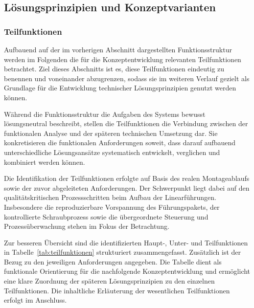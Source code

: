 \subsection{Lösungsprinzipien und Konzeptvarianten}
\subsubsection{Teilfunktionen}
\label{sec:teilfunktionen}
Aufbauend auf der im vorherigen Abschnitt dargestellten Funktionsstruktur werden im Folgenden die für die Konzeptentwicklung relevanten Teilfunktionen betrachtet. Ziel dieses Abschnitts ist es, diese Teilfunktionen eindeutig zu benennen und voneinander abzugrenzen, sodass sie im weiteren Verlauf gezielt als Grundlage für die Entwicklung technischer Lösungsprinzipien genutzt werden können.

Während die Funktionsstruktur die Aufgaben des Systems bewusst lösungsneutral beschreibt, stellen die Teilfunktionen die Verbindung zwischen der funktionalen Analyse und der späteren technischen Umsetzung dar. Sie konkretisieren die funktionalen Anforderungen soweit, dass darauf aufbauend unterschiedliche Lösungsansätze systematisch entwickelt, verglichen und kombiniert werden können.\cite{VDI2221, MKon_VL}

Die Identifikation der Teilfunktionen erfolgte auf Basis des realen Montageablaufs sowie der zuvor abgeleiteten Anforderungen. Der Schwerpunkt liegt dabei auf den qualitätskritischen Prozessschritten beim Aufbau der Linearführungen. Insbesondere die reproduzierbare Vorspannung des Führungspakets, der kontrollierte Schraubprozess sowie die übergeordnete Steuerung und Prozessüberwachung stehen im Fokus der Betrachtung.

Zur besseren Übersicht sind die identifizierten Haupt-, Unter- und Teilfunktionen in Tabelle~\ref{tab:teilfunktionen} strukturiert zusammengefasst. Zusätzlich ist der Bezug zu den jeweiligen Anforderungen angegeben. Die Tabelle dient als funktionale Orientierung für die nachfolgende Konzeptentwicklung und ermöglicht eine klare Zuordnung der späteren Lösungsprinzipien zu den einzelnen Teilfunktionen. Die inhaltliche Erläuterung der wesentlichen Teilfunktionen erfolgt im Anschluss.

